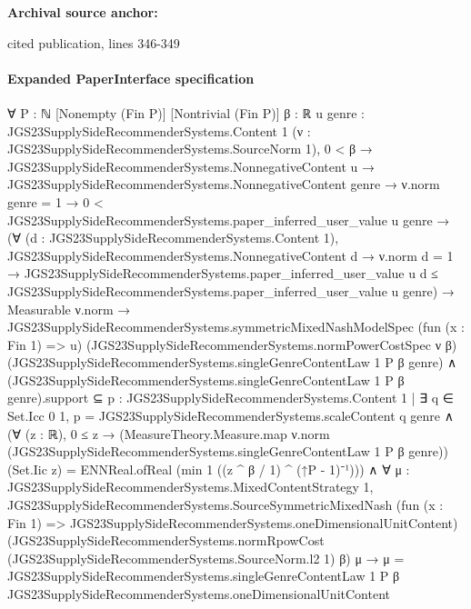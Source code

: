 \documentclass[10pt]{article}
\begin{document}
\textbf{Archival source anchor:} {\footnotesize\raggedright cited publication, lines 346-\allowbreak{}349\par}
\paragraph{Expanded PaperInterface specification}
\begin{ReviewVerbatim}
∀ {P : ℕ} [Nonempty (Fin P)] [Nontrivial (Fin P)] {β : ℝ} {u genre : JGS23SupplySideRecommenderSystems.Content 1}
  (ν : JGS23SupplySideRecommenderSystems.SourceNorm 1),
  0 < β →
    JGS23SupplySideRecommenderSystems.NonnegativeContent u →
      JGS23SupplySideRecommenderSystems.NonnegativeContent genre →
        ν.norm genre = 1 →
          0 < JGS23SupplySideRecommenderSystems.paper_inferred_user_value u genre →
            (∀ (d : JGS23SupplySideRecommenderSystems.Content 1),
                JGS23SupplySideRecommenderSystems.NonnegativeContent d →
                  ν.norm d = 1 →
                    JGS23SupplySideRecommenderSystems.paper_inferred_user_value u d ≤
                      JGS23SupplySideRecommenderSystems.paper_inferred_user_value u genre) →
              Measurable ν.norm →
                JGS23SupplySideRecommenderSystems.symmetricMixedNashModelSpec (fun (x : Fin 1) => u)
                    (JGS23SupplySideRecommenderSystems.normPowerCostSpec ν β)
                    (JGS23SupplySideRecommenderSystems.singleGenreContentLaw 1 P β genre) ∧
                  (JGS23SupplySideRecommenderSystems.singleGenreContentLaw 1 P β genre).support ⊆
                      {p : JGS23SupplySideRecommenderSystems.Content 1 |
                        ∃ q ∈ Set.Icc 0 1, p = JGS23SupplySideRecommenderSystems.scaleContent q genre} ∧
                    (∀ (z : ℝ),
                        0 ≤ z →
                          (MeasureTheory.Measure.map ν.norm
                                (JGS23SupplySideRecommenderSystems.singleGenreContentLaw 1 P β genre))
                              (Set.Iic z) =
                            ENNReal.ofReal (min 1 ((z ^ β / 1) ^ (↑P - 1)⁻¹))) ∧
                      ∀ {μ : JGS23SupplySideRecommenderSystems.MixedContentStrategy 1},
                        JGS23SupplySideRecommenderSystems.SourceSymmetricMixedNash
                            (fun (x : Fin 1) => JGS23SupplySideRecommenderSystems.oneDimensionalUnitContent)
                            (JGS23SupplySideRecommenderSystems.normRpowCost
                              (JGS23SupplySideRecommenderSystems.SourceNorm.l2 1) β)
                            μ →
                          μ =
                            JGS23SupplySideRecommenderSystems.singleGenreContentLaw 1 P β
                              JGS23SupplySideRecommenderSystems.oneDimensionalUnitContent
\end{ReviewVerbatim}
\end{document}
